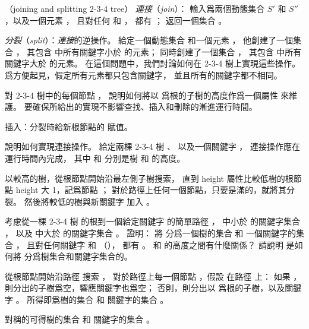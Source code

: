 \startPROBLEM
（joining and splitting 2-3-4 tree）
\emph{連接}（\emph{join}）：
輸入爲兩個動態集合 $S'$ 和 $S''$，以及一個元素 ，
且對任何  和 ，
都有 ；
返回一個集合 。

\emph{分裂}（\emph{split}）：\emph{連接}的逆操作。
給定一個動態集合  和一個元素 ，
他創建了一個集合 ，
其包含  中所有關鍵字小於  的元素；
同時創建了一個集合 ，
其包含  中所有關鍵字大於  的元素。
在這個問題中，我們討論如何在 2-3-4 樹上實現這些操作。
爲方便起見，假定所有元素都只包含關鍵字，
並且所有的關鍵字都不相同。

\startigBase[a]\startitem
對 2-3-4 樹中的每個節點 ，
說明如何將以  爲根的子樹的高度作爲一個屬性  來維護。
要確保所給出的實現不影響查找、插入和刪除的漸進運行時間。
\stopitem\stopigBase

\startANSWER
插入：分裂時給新根節點的  賦值。
\stopANSWER

\startigBase[continue]\startitem
說明如何實現連接操作。
給定兩棵 2-3-4 樹 、  以及一個關鍵字 ，
連接操作應在  運行時間內完成，
其中  和  分別是樹  和  的高度。
\stopitem\stopigBase

\startANSWER
以較高的樹，從根節點開始沿最左側子樹搜索，
直到 height 屬性比較低樹的根節點 height 大 1，記爲節點 ；
對於路徑上任何一個節點，只要是滿的，就將其分裂。
然後將較低的樹與新關鍵字  加入 。
\stopANSWER

\startigBase[continue]\startitem
考慮從一棵 2-3-4 樹  的根到一個給定關鍵字  的簡單路徑 ，
  中小於  的關鍵字集合 ，
以及  中大於  的關鍵字集合 。
證明：  將  分爲一個樹的集合  和
一個關鍵字的集合 ，
且對任何關鍵字  和  （），
都有 。
  和  的高度之間有什麼關係？
請說明  是如何將  分爲樹集合和關鍵字集合的。
\stopitem\stopigBase

\startANSWER
從根節點開始沿路徑  搜索 ，
對於路徑上每一個節點 ，假設  在路徑  上：
如果 ，則分出的子樹爲空，響應關鍵字也爲空；
否則，則分出以  爲根的子樹，以及關鍵字 。
所得即爲樹的集合  和
關鍵字的集合 。

對稱的可得樹的集合  和
關鍵字的集合 。

